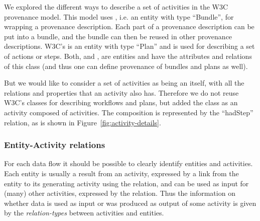 

We explored the different ways to describe a set of activities in the W3C 
provenance model. This model uses , i.e. an entity with type ``Bundle'', 
for wrapping a provenance description. Each part of a provenance description can be 
put into a bundle, and the bundle can then be reused in other provenance descriptions. 
W3C's  is an entity with type ``Plan'' and is used for describing a 
set of actions or steps. Both,  and , are entities and 
have the attributes and relations of this class (and thus one can define provenance of bundles and plans as well).

But we would like to consider a set of activities as being an  itself, 
with all the relations and properties that an activity also has. Therefore we do not reuse
W3C's classes for describing workflows and plans, but added 
the class  as an activity composed of activities. The composition is represented by 
the ``hadStep'' relation, as is shown in Figure~\ref{fig:activity-details}.

%



\subsubsection{Entity-Activity relations}\label{sec:entity-activity-relations}

For each data flow it should be possible to clearly identify entities and 
activities. 
Each entity is usually a result from an activity, expressed by a link from 
the entity to its generating activity using the  relation,
and can be used as input for (many) other activities, expressed by the  relation.
Thus the information on whether data is used as input or was produced as output of 
some activity is given by the \emph{relation-types} between activities and entities.

